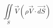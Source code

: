 \begin{equation}
  \iint\limits_S \overrightarrow{V}\left(\rho\overrightarrow{V}\cdot\overrightarrow{dS}\right)
\end{equation}

